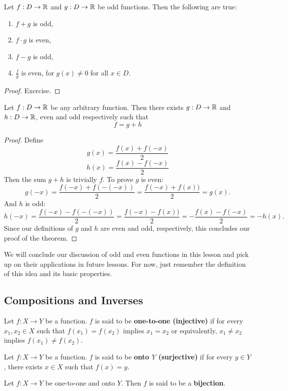 \begin{theorem}
	\label{thm:oo}
	Let $f: D\to\mathbb{R}$ and $g: D\to\mathbb{R}$ be odd functions. Then the following are true:
	\begin{enumerate}
		\item $f+g$ is odd,
		\item $f\cdot g$ is even,
		\item $f-g$ is odd,
		\item $\frac{f}{g}$ is even, for $g(x)\neq 0$ for all $x\in D$. 
	\end{enumerate}
\end{theorem}
\begin{proof}
	Exercise.
\end{proof}

\begin{theorem}
	Let $f: D\to\mathbb{R}$ be any arbitrary function. Then there exists $g:D\to\mathbb{R}$ and $h:D\to\mathbb{R}$, even and odd respectively such that
	$$f=g+h$$
\end{theorem}
\begin{proof}
	Define
	$$g(x)=\frac{f(x)+f(-x)}{2}$$
	$$h(x)=\frac{f(x)-f(-x)}{2}$$
	Then the sum $g+h$ is trivially $f$. 
	To prove $g$ is even:
	$$g(-x)=\frac{f(-x)+f(-(-x))}{2}=\frac{f(-x)+f(x))}{2}=g(x).$$
	And $h$ is odd:
	$$h(-x)=\frac{f(-x)-f(-(-x))}{2}=\frac{f(-x)-f(x))}{2}=-\frac{f(x)-f(-x)}{2}=-h(x).$$
	Since our definitions of $g$ and $h$ are even and odd, respectively, this concludes our proof of the theorem. 
\end{proof}

We will conclude our discussion of odd and even functions in this lesson and pick up on their applications in future lessons. For now, just remember the definition of this idea and its basic properties. 

\subsection{Compositions and Inverses}
\begin{define}
	Let $f: X\to Y$ be a function. $f$ is said to be \textbf{one-to-one (injective)} if for every $x_1,x_2\in X$ such that $f(x_1)=f(x_2)$ implies $x_1=x_2$ or equivalently, $x_1\neq x_2$ implies $f(x_1)\neq f(x_2)$.
\end{define}
\begin{define}
	Let $f: X\to Y$ be a function. $f$ is said to be \textbf{onto $Y$ (surjective)} if for every $y\in Y$, there exists $x\in X$ such that $f(x)=y$.
\end{define}
\begin{define}
Let $f:X\to Y$ be one-to-one and onto $Y$. Then $f$ is said to be a \textbf{bijection}.	
\end{define}

